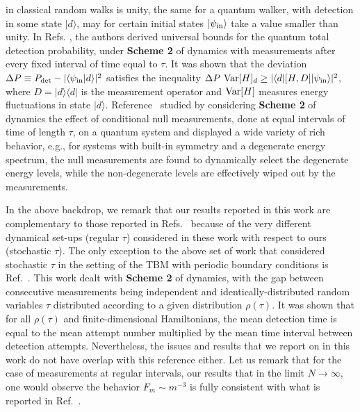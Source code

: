 \documentclass[12pt]{iopart}
\begin{document}
in classical random walks is unity, the same for a quantum walker, with detection in some state $|d\rangle$,  may for certain initial states $|\psi_{\rm in}\rangle$ take a value smaller than unity. In Refs. \cite{Thiel:2020-1, Thiel:2021}, the authors derived universal bounds  for the quantum total detection probability, under {\bf Scheme 2} of dynamics with measurements after every fixed interval of time equal to $\tau$.  It was shown that the deviation $\Delta P \equiv P_{\rm det}-|\langle \psi_{\rm in}|d\rangle|^2$ satisfies the inequality $\Delta P~{\rm Var}[H]_d \ge |\langle d|[H,D]|\psi_{\rm in}\rangle|^2$, where $D=|d\rangle \langle d|$ is the measurement operator and ${\rm Var}[H]$ measures energy fluctuations in state $|d\rangle$.  Reference~\cite{Liu:2021} studied by considering {\bf Scheme 2} of dynamics the effect of conditional null measurements, done at equal intervals of time of length $\tau$, on a quantum system and displayed a wide variety of rich behavior,  e.g., for systems with built-in symmetry and a degenerate energy spectrum, the null measurements are found to dynamically select the degenerate energy levels, while the non-degenerate levels are effectively wiped out by the measurements.  

In the above backdrop,  we remark that our results reported in this work are complementary to those reported in Refs.~\cite{Dhar:2015,Dhar:2015-1,Friedman:2017,Friedman:2017-1,Thiel:2018,Thiel:2019,Lahiri:2019,Meidan:2019,Yin:2019,Thiel:2020,Thiel:2020-1,Dubey:2021,Thiel:2021,Liu:2021} because of the very different dynamical set-ups (regular $\tau$) considered in these work with respect to ours (stochastic $\tau$). The only exception to the above set of work that considered stochastic $\tau$ in the setting of the TBM with periodic boundary conditions is Ref.~\cite{Kessler:2021}. This work dealt with {\bf Scheme 2} of dynamics, with the gap between consecutive measurements being independent and identically-distributed random variables $\tau$ distributed according to a given distribution $\rho(\tau)$. It was shown that for all $\rho(\tau)$ and finite-dimensional Hamiltonians, the mean detection time is equal to the mean attempt number multiplied by the mean time interval between detection attempts.  Nevertheless,  the issues and results that we report on in this work do not have overlap with this reference either.  Let us remark that for the case of measurements at regular intervals,  our results that in the limit $N \to \infty$, one would observe the behavior $F_m \sim m^{-3}$ is fully consistent with what is reported in Ref.~\cite{Friedman:2017-1}.
\end{document}
